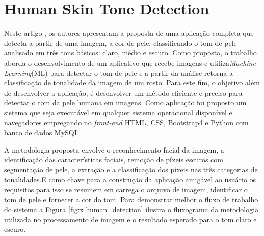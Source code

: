 \section{Human Skin Tone Detection}

Neste artigo \cite{Human_Skin_Tone_Detection}, os autores apresentam a proposta de uma aplicação completa que detecta a partir de uma imagem, a cor de pele, classificando o tom de pele analisado em três tons básicos: claro, médio e escuro. Como proposta, o trabalho aborda o desenvolvimento de um aplicativo que recebe imagens e utiliza\textit{Machine Learning}(ML) para detectar o tom de pele e a partir da análise retorna a classificação de tonalidade da imagem de um rosto. Para este fim, o objetivo além de desenvolver a aplicação, é desenvolver um método eficiente e preciso para detectar o tom da pele humana em imagens. Como aplicação foi proposto um sistema que seja executável em qualquer sistema operacional disponível e navegadores empregando no \textit{front-end} HTML, CSS, Bootstrap4 e Python com banco de dados MySQL.

A metodologia proposta envolve o reconhecimento facial da imagem, a identificação das características faciais, remoção de píxeis escuros com segmentação de pele, a extração e  a classificação dos píxeis nas três categorias de tonalidades.E como chave para a construção da aplicação amigável ao usuário os requisitos para isso se resumem em carrega o arquivo de imagem, identificar o tom de pele e fornecer a cor do tom. Para demonstrar melhor o fluxo de trabalho do sistema a Figura \ref{fig:x human_detection} ilustra o fluxograma da metodologia utilizada no processamento de imagem e o resultado esperado para o tom claro e escuro.

